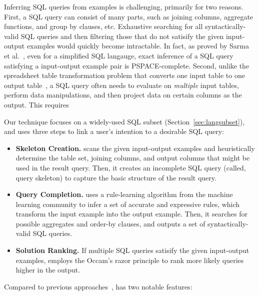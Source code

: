 Inferring SQL queries from examples is challenging,
primarily for two reasons. First, a SQL query can consist
of many parts, such as joining columns, aggregate functions,
and group by clauses, etc. Exhaustive searching for all
syntactically-valid SQL queries and then filtering those that do not
satisify the given input-output examples would quickly
become intractable. In fact, as proved
by Sarma et al.~\cite{DasSarma:2010}, even for a simplified
SQL langauge, exact inference of a SQL query satisfying
a input-output example pair is PSPACE-complete.
Second, unlike the spreadsheet
table transformation problem that converts one input
table to one output table~\cite{Harris:2011}, a SQL query often
needs to evaluate on \textit{multiple} input tables, perform
data manipulations, and then project data on
certain columns as the output. This requires 


Our \ourtool technique focuses on a widely-used SQL subset (Section~\ref{sec:langsubset}),
and uses three steps to link a user's intention to
a desirable SQL query:



\begin{itemize}
\item \textbf{Skeleton Creation.} \ourtool scans the
given input-output examples and heuristically
determine the table set, joining columns, and output columns that might
be used in the result query. Then, it creates an
incomplete SQL query (called, query skeleton) to
capture the basic structure of the result query.

\item \textbf{Query Completion.} \ourtool
uses a rule-learning algorithm from the machine
learning community to infer a set of accurate
and expressive rules, which transform the input
example into the output example. Then, it
searches for possible aggregates and order-by clauses, and
outputs a set of syntactically-valid SQL
queries. 


\item \textbf{Solution Ranking.} If multiple SQL
queries satisify the given input-output examples,
\ourtool employs the Occam's razor principle to
rank more likely queries higher in the output.
\end{itemize}

Compared to previous approaches~\cite{Zloof:1975,
Tran:2009, DasSarma:2010, abs-1208-2013}, \ourtool has two notable features:

